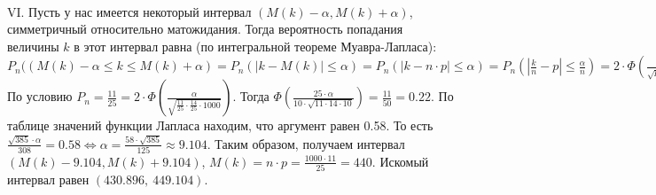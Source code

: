 \documentclass{article}
\begin{document}
\vspace{\baselineskip}
\\
VI. Пусть у нас имеется некоторый интервал \begin{math}
(M(k) - \alpha, M(k) + \alpha)
\end{math}, симметричный относительно матожидания. Тогда вероятность попадания величины \begin{math}
k
\end{math} в этот интервал равна (по интегральной теореме Муавра-Лапласа):
\begin{math}
P_n((M(k) - \alpha \leq k \leq M(k) + \alpha) = P_n(|k - M(k)| \leq \alpha) = P_n(|k - n\cdot p| \leq \alpha) = P_n\left(\left| \displaystyle\frac{k}{n}- p\right| \leq \displaystyle\frac{\alpha}{n}\right) = 2\cdot\Phi\left(\displaystyle\frac{\alpha}{\sqrt{p \cdot q\cdot n}}\right).
\end{math} По условию \begin{math}
P_n = \displaystyle\frac{11}{25} = 2\cdot\Phi\left(\displaystyle\frac{\alpha}{\sqrt{\displaystyle\frac{11}{25} \cdot \displaystyle\frac{14}{25}\cdot 1000}}\right) 
\end{math}. Тогда \begin{math}\Phi\left(\displaystyle\frac{25 \cdot\alpha}{10 \cdot \sqrt{11 \cdot 14 \cdot 10}}\right) = \displaystyle\frac{11}{50}  = 0.22\end{math}. По таблице значений функции Лапласа находим, что аргумент равен 0.58. То есть \begin{math}
 \displaystyle\frac{\sqrt{385} \cdot\alpha}{308}= 0.58 \Leftrightarrow \alpha = \displaystyle\frac{58 \cdot\sqrt{385}}{125} \approx 9.104
\end{math}. Таким образом, получаем интервал \begin{math}
(M(k) - 9.104, M(k) + 9.104)
\end{math}, \begin{math}
M(k) = n \cdot p = \displaystyle\frac{1000 \cdot 11}{25} = 440.
\end{math} Искомый интервал равен \begin{math}
(430.896, \ 449.104)
\end{math}.
\vspace{\baselineskip}
\\
\end{document}
